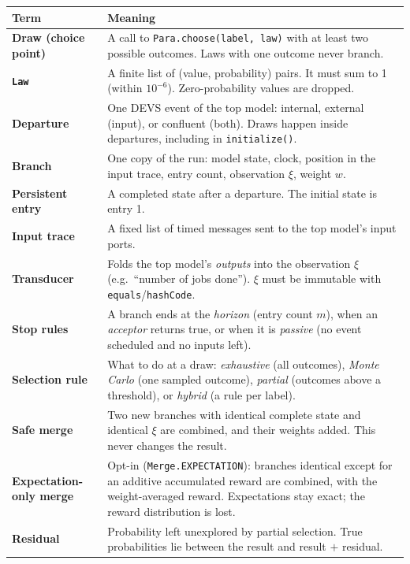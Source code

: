 \documentclass[11pt]{article}
\newcommand{\code}[1]{\texttt{#1}}
\begin{document}
\begin{center}
\begin{tabularx}{\linewidth}{@{}>{\bfseries}p{3.1cm} Y@{}}
\toprule
Term & Meaning\\
\midrule
Draw (choice point) & A call to \code{Para.choose(label, law)} with at least two possible outcomes. Laws with one outcome never branch.\\
\code{Law} & A finite list of (value, probability) pairs. It must sum to 1 (within $10^{-6}$). Zero-probability values are dropped.\\
Departure & One DEVS event of the top model: internal, external (input), or confluent (both). Draws happen inside departures, including in \code{initialize()}.\\
Branch & One copy of the run: model state, clock, position in the input trace, entry count, observation $\xi$, weight $w$.\\
Persistent entry & A completed state after a departure. The initial state is entry 1.\\
Input trace & A fixed list of timed messages sent to the top model's input ports.\\
Transducer & Folds the top model's \emph{outputs} into the observation $\xi$ (e.g.\ ``number of jobs done''). $\xi$ must be immutable with \code{equals}/\code{hashCode}.\\
Stop rules & A branch ends at the \emph{horizon} (entry count $m$), when an \emph{acceptor} returns true, or when it is \emph{passive} (no event scheduled and no inputs left).\\
Selection rule & What to do at a draw: \emph{exhaustive} (all outcomes), \emph{Monte Carlo} (one sampled outcome), \emph{partial} (outcomes above a threshold), or \emph{hybrid} (a rule per label).\\
Safe merge & Two new branches with identical complete state and identical $\xi$ are combined, and their weights added. This never changes the result.\\
Expectation-only merge & Opt-in (\code{Merge.EXPECTATION}): branches identical except for an additive accumulated reward are combined, with the weight-averaged reward. Expectations stay exact; the reward distribution is lost.\\
Residual & Probability left unexplored by partial selection. True probabilities lie between the result and result $+$ residual.\\
\bottomrule
\end{tabularx}
\end{center}
\end{document}
